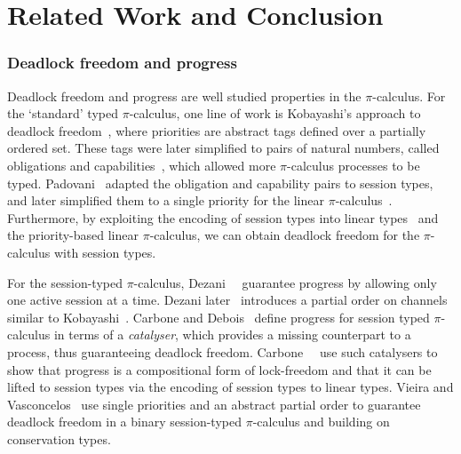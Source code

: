\documentclass[main.tex]{subfiles}
\begin{document}
\section{Related Work and Conclusion}
\subsubsection*{Deadlock freedom and progress}
Deadlock freedom and progress are well studied properties in the $\pi$-calculus.
For the `standard' typed $\pi$-calculus, one line of work is Kobayashi's approach to deadlock freedom~\cite{kobayashi98}, where priorities are abstract tags defined over a partially ordered set. These tags were later simplified to pairs of natural numbers, called obligations and capabilities~\cite{kobayashi06}, which allowed more $\pi$-calculus processes to be typed. Padovani~\cite{padovani13} adapted the obligation and capability pairs to session types, and later simplified them to a single priority for the linear $\pi$-calculus~\cite{padovani14}.  Furthermore, by exploiting the encoding of session types into linear types~\cite{kobayashi07,dardhagiachino12,dardha14beat} and the priority-based linear $\pi$-calculus,
we can obtain deadlock freedom for the $\pi$-calculus with session types.

For the session-typed $\pi$-calculus, Dezani~\etal~\cite{dezani-ciancaglinimostrous06} guarantee progress by allowing only one active session at a time. Dezani later~\cite{dezani-ciancagliniliguoro09progress} introduces a partial order on channels similar to Kobayashi~\cite{kobayashi98}. Carbone and Debois~\cite{carbonedebois10} define progress for session typed $\pi$-calculus in terms of a \emph{catalyser}, which provides a missing counterpart to a process, thus guaranteeing deadlock freedom.
Carbone~\etal~\cite{carbonedardha14} use such catalysers to show that progress is a compositional form of lock-freedom and that it can be lifted to session types via the encoding of session types to linear types. Vieira and Vasconcelos~\cite{vieiravasconcelos13} use single priorities and an abstract partial order to guarantee deadlock freedom in a binary session-typed $\pi$-calculus and building on conservation types.
\end{document}
